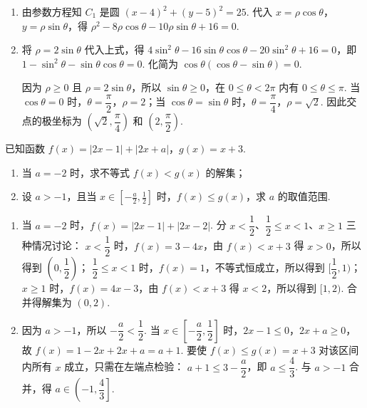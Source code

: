 \begin{solution}
\begin{enumerate}
\item 由参数方程知 \(C_1\) 是圆 \((x-4)^2+(y-5)^2=25\). 代入 \(x=\rho\cos\theta\)，\(y=\rho\sin\theta\)，得
\(\rho^2-8\rho\cos\theta-10\rho\sin\theta+16=0\).

\item 将 \(\rho=2\sin\theta\) 代入上式，得
\(4\sin^2\theta-16\sin\theta\cos\theta-20\sin^2\theta+16=0\)，即
\(1-\sin^2\theta-\sin\theta\cos\theta=0\). 化简为
\(\cos\theta(\cos\theta-\sin\theta)=0\).

因为 \(\rho\geqslant0\) 且 \(\rho=2\sin\theta\)，所以 \(\sin\theta\geqslant0\)，在 \(0\leqslant\theta<2\pi\) 内有 \(0\leqslant\theta\leqslant\pi\). 当 \(\cos\theta=0\) 时，\(\theta=\dfrac\pi2\)，\(\rho=2\)；当 \(\cos\theta=\sin\theta\) 时，\(\theta=\dfrac\pi4\)，\(\rho=\sqrt2\). 因此交点的极坐标为 \(\left(\sqrt2,\dfrac\pi4\right)\) 和 \(\left(2,\dfrac\pi2\right)\).
\end{enumerate}
\end{solution}

\begin{problem}
已知函数 \( f(x) = |2x - 1| + |2x + a| \)，\( g(x) = x + 3 \).
\begin{enumerate}
\item 当 \(a = -2\) 时，求不等式 \(f(x) < g(x)\) 的解集；
\item 设 \(a > -1\)，且当 \(x \in \left[-\frac{a}{2}, \frac{1}{2}\right]\) 时，\(f(x) \leqslant g(x)\)，求 \(a\) 的取值范围.
\end{enumerate}
\end{problem}

\begin{solution}
\begin{enumerate}
\item 当 \(a=-2\) 时，\(f(x)=|2x-1|+|2x-2|\). 分 \(x<\dfrac12\)、\(\dfrac12\leqslant x<1\)、\(x\geqslant1\) 三种情况讨论：
\(x<\dfrac12\) 时，\(f(x)=3-4x\)，由 \(f(x)<x+3\) 得 \(x>0\)，所以得到 \((0,\dfrac12)\)；
\(\dfrac12\leqslant x<1\) 时，\(f(x)=1\)，不等式恒成立，所以得到 \([\dfrac12,1)\)；
\(x\geqslant1\) 时，\(f(x)=4x-3\)，由 \(f(x)<x+3\) 得 \(x<2\)，所以得到 \([1,2)\). 合并得解集为 \((0,2)\).

\item 因为 \(a>-1\)，所以 \(-\dfrac a2<\dfrac12\). 当 \(x\in[-\dfrac a2,\dfrac12]\) 时，\(2x-1\leqslant0\)，\(2x+a\geqslant0\)，故
\(f(x)=1-2x+2x+a=a+1\). 要使 \(f(x)\leqslant g(x)=x+3\) 对该区间内所有 \(x\) 成立，只需在左端点检验：
\(a+1\leqslant3-\dfrac a2\)，即 \(a\leqslant\dfrac43\). 与 \(a>-1\) 合并，得 \(a\in\left(-1,\dfrac43\right]\).
\end{enumerate}
\end{solution}
